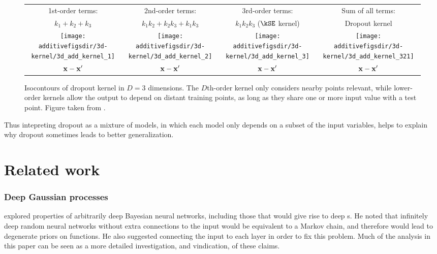 \documentclass{article} %
\begin{document}
\begin{figure}[h!]
\centering
\renewcommand{\tabcolsep}{0pt}
\begin{tabular}{cccc}
1st-order terms: & 2nd-order terms: &  3rd-order terms: & Sum of all terms: \\
$k_1 + k_2 + k_3$ & $k_1k_2 + k_2k_3 + k_1k_3$ & $k_1k_2k_3$ ($\kSE$ kernel) & Dropout kernel \\
\texttt{[image: \\additivefigsdir/3d-kernel/3d\_add\_kernel\_1]} &
\texttt{[image: \\additivefigsdir/3d-kernel/3d\_add\_kernel\_2]} &
\texttt{[image: \\additivefigsdir/3d-kernel/3d\_add\_kernel\_3]} & 
\texttt{[image: \\additivefigsdir/3d-kernel/3d\_add\_kernel\_321]}\\
${\bf{x}} - {\bf{x}}'$ & ${\bf{x}} - {\bf{x}}'$ & ${\bf{x}} - {\bf{x}}'$ & ${\bf{x}} - {\bf{x}}'$\\[0.5em]
\end{tabular}
\caption[Isocontours of additive kernels in 3 dimensions]
{Isocontours of dropout kernel in $D = 3$ dimensions.
The $D$th-order kernel only considers nearby points relevant, while lower-order kernels allow the output to depend on distant training points, as long as they share one or more input value with a test point.
Figure taken from \citet{duvenaud2011additive11}.
}
\label{fig:kernels3d}
\end{figure}

Thus intepreting dropout as a mixture of models, in which each model only depends on a subset of the input variables, helps to explain why dropout sometimes leads to better generalization.






\section{Related work}

\subsubsection{Deep Gaussian processes}
\citet[chapter 2]{neal1995bayesian} explored properties of arbitrarily deep Bayesian neural networks, including those that would give rise to deep \gp{}s.
He noted that infinitely deep random neural networks without extra connections to the input would be equivalent to a Markov chain, and therefore would lead to degenerate priors on functions.
He also suggested connecting the input to each layer in order to fix this problem.
Much of the analysis in this paper can be seen as a more detailed investigation, and vindication, of these claims.
\end{document}
